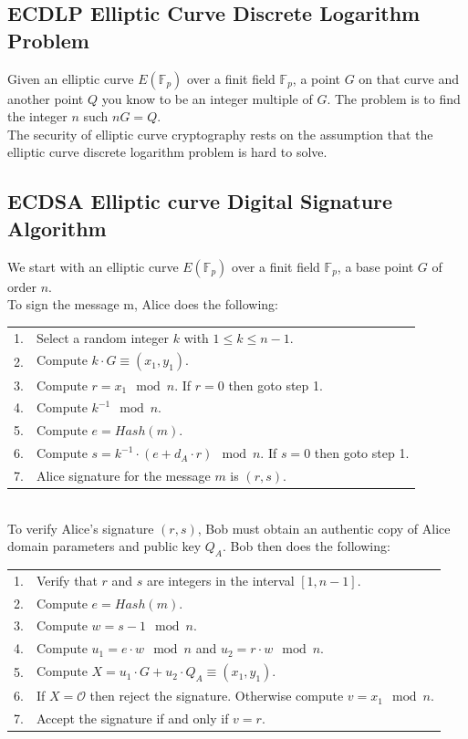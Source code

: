 \subsection{ECDLP Elliptic Curve Discrete Logarithm Problem}

Given an elliptic curve $E(\mathbb{F}_p)$ over a finit field $\mathbb{F}_p$, a point $G$ on that curve and another point $Q$ you know to
be an integer multiple of $G$. The problem is to find the integer $n$ such $nG=Q$.\\
The security of elliptic curve cryptography rests on the assumption that the elliptic curve discrete logarithm problem is hard to solve.\\

\subsection{ECDSA Elliptic curve Digital Signature Algorithm}
We start with an elliptic curve $E(\mathbb{F}_p)$ over a finit field $\mathbb{F}_p$, a base point $G$ of order $n$.\\
To sign the message m, Alice does the following:\\
\begin{tabular}{l l}
	1. 	&	Select a random integer $k$ with $1 \leq k \leq n-1$. \\
	2. 	&	Compute $k \cdot G \equiv (x_1, y_1)$. \\
	3. 	&	Compute $r = x_1 \mod n$. If $r = 0$ then goto step 1.\\
	4. 	&	Compute $k^{-1} \mod n$.\\
	5. 	&	Compute $e = Hash(m)$.\\
	6. 	&	Compute $s=k^{-1} \cdot (e+d_A \cdot r) \mod n$. If $s = 0$ then goto step 1.\\
	7. 	&	Alice signature for the message $m$ is $(r, s)$.\\
\end{tabular}\\

To verify Alice's signature $(r, s)$, Bob must obtain an authentic copy of Alice domain parameters
and public key $Q_A$. Bob then does the following:\\
\begin{tabular}{l l}
	1. 	&	Verify that $r$ and $s$ are integers in the interval $[1, n-1]$.\\
	2. 	&	Compute $e = Hash(m)$.\\
	3. 	&	Compute $w = s-1 \mod n$.\\
	4. 	&	Compute $u_1 = e \cdot w \mod n$ and $u_2 = r \cdot w \mod n$.\\
	5. 	&	Compute $X = u_1 \cdot G + u_2 \cdot Q_A \equiv (x_1, y_1)$.\\
	6. 	&	If $X = \mathcal{O}$ then reject the signature. Otherwise compute $v = x_1 \mod n$.\\
	7. 	&	Accept the signature if and only if $v = r$.\\
\end{tabular}
